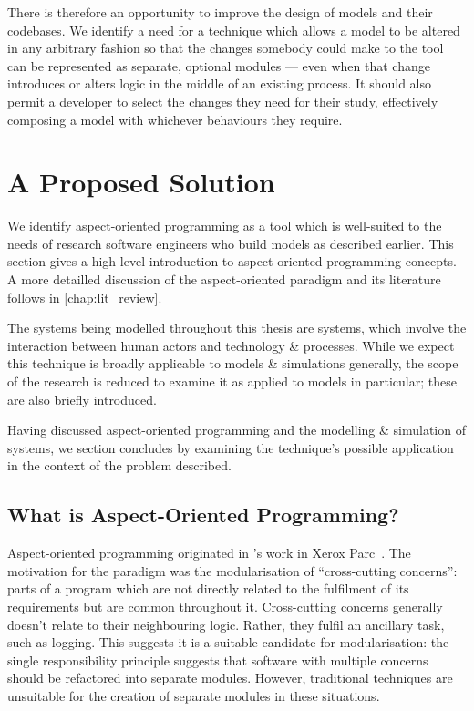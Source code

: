 There is therefore an opportunity to improve the design of models and their
codebases. We identify a need for a technique which allows a model to be altered
in any arbitrary fashion so that the changes somebody could make to the tool can
be represented as separate, optional modules --- even when that change
introduces or alters logic in the middle of an existing process. It should also
permit a developer to select the changes they need for their study, effectively
composing a model with whichever behaviours they require.



\section{A Proposed Solution}
We identify aspect-oriented programming as a tool which is well-suited to the
needs of research software engineers who build models as described earlier. This
section gives a high-level introduction to aspect-oriented programming concepts.
A more detailled discussion of the aspect-oriented
paradigm and its literature follows in \cref{chap:lit_review}.

The systems being modelled throughout this thesis are \sociotechnical systems,
which involve the interaction between human actors and technology \& processes.
While we expect this technique is broadly applicable to models \& simulations
generally, the scope of the research is reduced to examine it as applied to
\sociotechnical models in particular; these are also briefly introduced.

Having discussed aspect-oriented programming and the modelling \& simulation of
\sociotechnical systems, we section concludes by examining the technique's
possible application in the context of the problem described.





\subsection{What is Aspect-Oriented Programming?}

Aspect-oriented programming originated in \citeauthor{kiczales1997aspect}'s work
in Xerox Parc~\cite{kiczales1997aspect}. The motivation for the paradigm was the
modularisation of ``cross-cutting concerns'': parts of a program which are not
directly related to the fulfilment of its requirements but are common throughout
it. Cross-cutting concerns generally doesn't relate to their neighbouring logic.
Rather, they fulfil an ancillary task, such as logging. This suggests it is a
suitable candidate for modularisation: the single responsibility
principle suggests that software with multiple
concerns should be refactored into separate modules. However, traditional
techniques are unsuitable for the creation of separate modules in these
situations.

